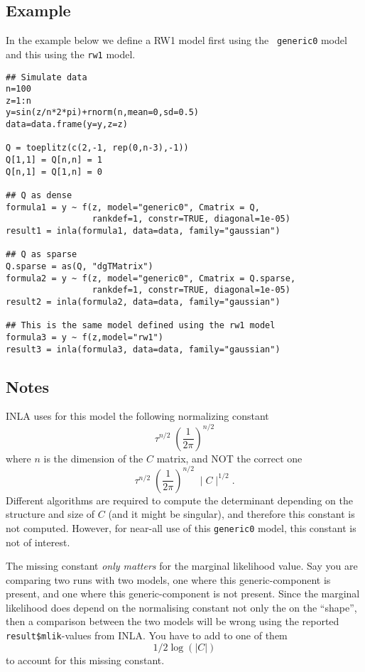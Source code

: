 \documentclass[a4paper,11pt]{article}
\begin{document}
\subsection*{Example}
In the example below we define a RW1 model first using the {\tt
    generic0} model and this using the {\tt rw1} model.
\begin{verbatim}
## Simulate data
n=100
z=1:n
y=sin(z/n*2*pi)+rnorm(n,mean=0,sd=0.5)
data=data.frame(y=y,z=z)

Q = toeplitz(c(2,-1, rep(0,n-3),-1))
Q[1,1] = Q[n,n] = 1
Q[n,1] = Q[1,n] = 0

## Q as dense
formula1 = y ~ f(z, model="generic0", Cmatrix = Q,
                 rankdef=1, constr=TRUE, diagonal=1e-05)
result1 = inla(formula1, data=data, family="gaussian")

## Q as sparse
Q.sparse = as(Q, "dgTMatrix")
formula2 = y ~ f(z, model="generic0", Cmatrix = Q.sparse,
                 rankdef=1, constr=TRUE, diagonal=1e-05)
result2 = inla(formula2, data=data, family="gaussian")

## This is the same model defined using the rw1 model
formula3 = y ~ f(z,model="rw1")
result3 = inla(formula3, data=data, family="gaussian")
\end{verbatim}

\subsection*{Notes}

INLA uses for this model the following normalizing constant
\begin{displaymath}
    \tau^{n/2}\; \left(\frac{1}{2\pi}\right)^{n/2}
\end{displaymath}
where $n$ is the dimension of the $C$ matrix, and NOT the correct one
\begin{displaymath}
    \tau^{n/2}\; \left(\frac{1}{2\pi}\right)^{n/2}\; \mid C\mid^{1/2}.
\end{displaymath}
Different algorithms are required to compute the determinant depending
on the structure and size of $C$ (and it might be singular), and
therefore this constant is not computed. However, for near-all use of
this \texttt{generic0} model, this constant is not of interest.

The missing constant \emph{only matters} for the marginal likelihood
value.  Say you are comparing two runs with two models, one where this
generic-component is present, and one where this generic-component is
not present. Since the marginal likelihood does depend on the
normalising constant not only the on the ``shape'', then a comparison
between the two models will be wrong using the reported
\verb|result$mlik|-values from INLA. You have to add to one of them
\begin{displaymath}
    1/2 \log(|C|)
\end{displaymath}
to account for this missing constant.
\end{document}
